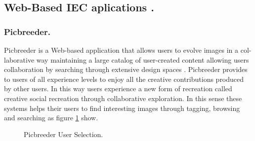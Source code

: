 \subsection{Web-Based IEC aplications .} 


\subsubsection{Picbreeder.}
Picbreeder is a Web-based application that allows users to evolve images in a
col-laborative way maintaining a large catalog of user-created content allowing
users collaboration by searching through extensive design spaces
\cite{secretan2008picbreeder}. Picbreeder provides to users of all
experience levels to enjoy all the creative contributions produced by other
users. In this way users experience a new form of recreation called creative
social recreation through collaborative exploration. In this sense these systems
helps their users to find interesting images through tagging, browsing and
searching as figure  \ref{fig:Picbreeder} show.

\begin{figure}
\captionsetup{justification=centering,margin=2cm}
\centering
\setlength\fboxsep{0pt}
\setlength\fboxrule{0.7pt}
\caption{Picbreeder User Selection.}
\label{fig:Picbreeder}       
\end{figure}

